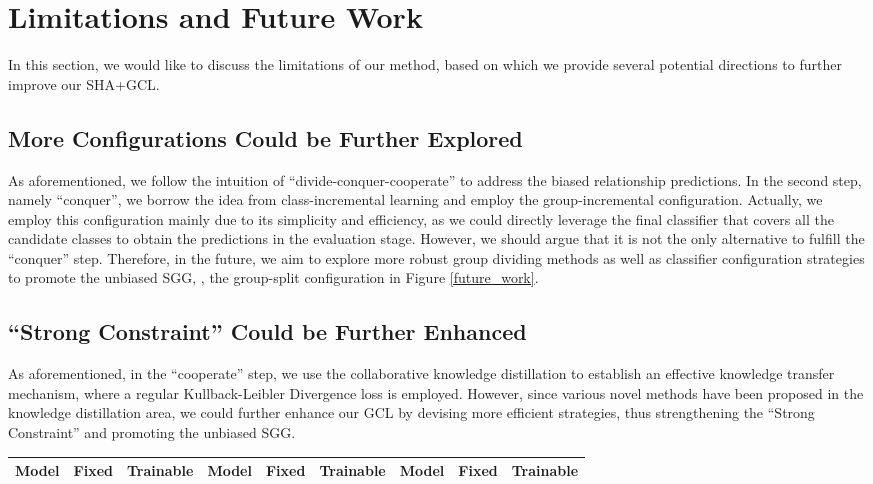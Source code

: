 \documentclass[10pt,twocolumn,letterpaper]{article}
\begin{document}
{\section{Limitations and Future Work}

In this section, we would like to discuss the limitations of our method, based on which we provide several potential directions to further improve our SHA+GCL.

\subsection{More Configurations Could be Further Explored}
As aforementioned, we follow the intuition of ``divide-conquer-cooperate'' to address the biased relationship predictions. In the second step, namely ``conquer'', we borrow the idea from class-incremental learning \cite{hu2020learning} and employ the group-incremental configuration. Actually, we employ this configuration mainly due to its simplicity and efficiency, as we could directly leverage the final classifier that covers all the candidate classes to obtain the predictions in the evaluation stage. However, we should argue that it is not the only alternative to fulfill the ``conquer'' step. Therefore, in the future, we aim to explore more robust group dividing methods as well as classifier configuration strategies to promote the unbiased SGG, \eg, the group-split configuration in Figure \ref{future_work}.

\subsection{``Strong Constraint'' Could be Further Enhanced}
As aforementioned, in the ``cooperate'' step, we use the collaborative knowledge distillation to establish an effective knowledge transfer mechanism, where a regular Kullback-Leibler Divergence loss is employed. However, since various novel methods have been proposed in the knowledge distillation area, we could further enhance our GCL by devising more efficient strategies, thus strengthening the ``Strong Constraint'' and promoting the unbiased SGG.

\begin{table*}[t]
	\small
	\begin{tabular}{p{2.0cm}<{\centering}p{1.1cm}<{\centering}p{1.1cm}<{\centering}|p{2.0cm}<{\centering}p{1.1cm}<{\centering}p{1.1cm}<{\centering}|p{2.0cm}<{\centering}|p{1.1cm}<{\centering}p{1.1cm}}
		\hline
		\multicolumn{1}{c}{Model}& \multicolumn{1}{c}{Fixed} & \multicolumn{1}{c|}{Trainable} & \multicolumn{1}{c}{Model} & \multicolumn{1}{c}{Fixed} & \multicolumn{1}{c|}{Trainable} & \multicolumn{1}{c}{Model} & \multicolumn{1}{c}{Fixed} & \multicolumn{1}{c}{Trainable}\\ \hline
		

\end{tabular}
\end{table*}}
\end{document}
